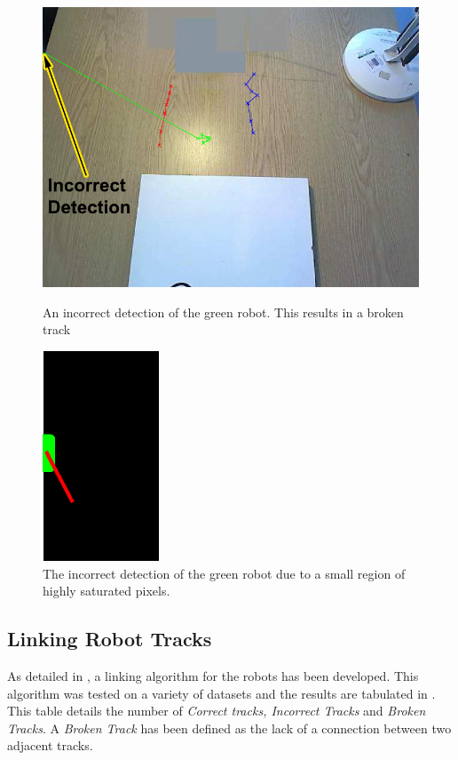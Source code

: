 \documentclass{article}
\begin{document}
\begin{figure}[h!]
\begin{minipage}[b]{0.5\linewidth}
\includegraphics[scale=0.5]{../Drawings/incorrectdetBackdata7.pdf}
\caption{An incorrect detection of the green robot. This results in a broken track}
\label{fig:InDetectData7}
\end{minipage}
\hspace{0.5cm}
\begin{minipage}[b]{0.5\linewidth}
\includegraphics[scale=0.8]{../Drawings/incorrectdetrobotdata7.pdf}
\caption{The incorrect detection of the green robot due to a small region of highly saturated pixels. }
\label{fig:greenInDetect}
\end{minipage}
\end{figure}

\subsection{Linking Robot Tracks}
\label{sec:linking}
As detailed in , a linking algorithm for the robots has been developed. This algorithm was tested on a variety of datasets and the results are tabulated in . This table details the number of \textit{Correct tracks, Incorrect Tracks} and \textit{Broken Tracks}. A \textit{Broken Track} has been defined as the lack of a connection between two adjacent tracks. \\
\end{document}
